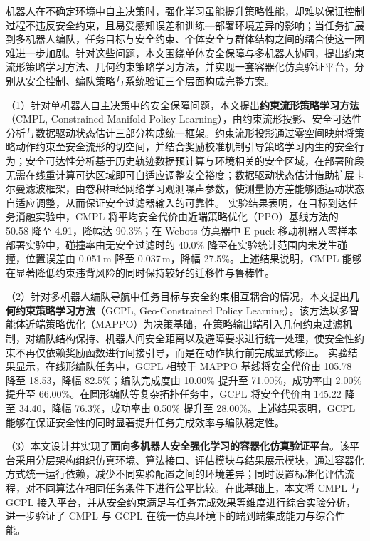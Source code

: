 \begin{ChineseAbstract}
机器人在不确定环境中自主决策时，强化学习虽能提升策略性能，却难以保证控制过程不违反安全约束，且易受感知误差和训练—部署环境差异的影响；当任务扩展到多机器人编队，任务目标与安全约束、个体安全与群体结构之间的耦合使这一困难进一步加剧。针对这些问题，本文围绕单体安全保障与多机器人协同，提出约束流形策略学习方法、几何约束策略学习方法，并实现一套容器化仿真验证平台，分别从安全控制、编队策略与系统验证三个层面构成完整方案。

（1）针对单机器人自主决策中的安全保障问题，本文提出\textbf{约束流形策略学习方法}（CMPL, Constrained Manifold Policy Learning），由约束流形投影、安全可达性分析与数据驱动状态估计三部分构成统一框架。约束流形投影通过零空间映射将策略动作约束至安全流形的切空间，并结合奖励校准机制引导策略学习内生的安全行为；安全可达性分析基于历史轨迹数据预计算与环境相关的安全区域，在部署阶段无需在线重计算可达区域即可自适应调整安全裕度；数据驱动状态估计借助扩展卡尔曼滤波框架，由卷积神经网络学习观测噪声参数，使测量协方差能够随运动状态自适应调整，从而保证安全过滤器输入的可靠性。
实验结果表明，在目标到达任务消融实验中，CMPL 将平均安全代价由近端策略优化（PPO）基线方法的 50.58 降至 4.91，降幅达 90.3\%；在 Webots 仿真器中 E-puck 移动机器人零样本部署实验中，碰撞率由无安全过滤时的 40.0\% 降至在实验统计范围内未发生碰撞，位置误差由 0.051\,m 降至 0.037\,m，降幅 27.5\%。上述结果说明，CMPL 能够在显著降低约束违背风险的同时保持较好的迁移性与鲁棒性。

（2）针对多机器人编队导航中任务目标与安全约束相互耦合的情况，本文提出\textbf{几何约束策略学习方法}（GCPL, Geo-Constrained Policy Learning）。该方法以多智能体近端策略优化（MAPPO）为决策基础，在策略输出端引入几何约束过滤机制，对编队结构保持、机器人间安全距离以及避障要求进行统一处理，使安全性约束不再仅依赖奖励函数进行间接引导，而是在动作执行前完成显式修正。
实验结果显示，在线形编队任务中，GCPL 相较于 MAPPO 基线将安全代价由 105.78 降至 18.53，降幅 82.5\%；编队完成度由 10.00\% 提升至 71.00\%，成功率由 2.00\% 提升至 66.00\%。在圆形编队等复杂拓扑任务中，GCPL 将安全代价由 145.22 降至 34.40，降幅 76.3\%，成功率由 0.50\% 提升至 28.00\%。上述结果表明，GCPL 能够在保证安全性的同时显著提升任务完成效率与编队稳定性。

（3）本文设计并实现了\textbf{面向多机器人安全强化学习的容器化仿真验证平台}。该平台采用分层架构组织仿真环境、算法接口、评估模块与结果展示模块，通过容器化方式统一运行依赖，减少不同实验配置之间的环境差异；同时设置标准化评估流程，对不同算法在相同任务条件下进行公平比较。在此基础上，本文将 CMPL 与 GCPL 接入平台，并从安全约束满足与任务完成效果等维度进行综合实验分析，进一步验证了 CMPL 与 GCPL 在统一仿真环境下的端到端集成能力与综合性能。

\end{ChineseAbstract}

